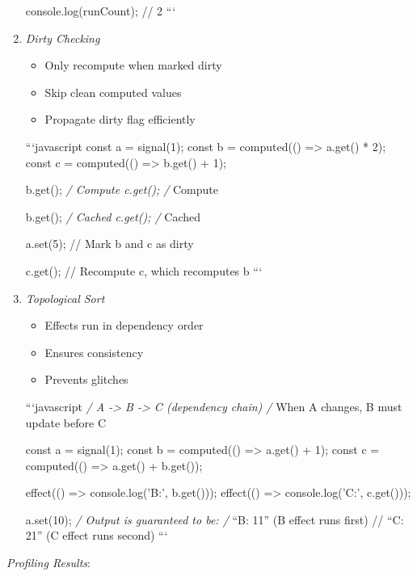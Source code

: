 \documentclass[11pt]{article}
\begin{document}
\begin{enumerate}
console.log(runCount); // 2
```

\item \emph{Dirty Checking}
\begin{itemize}
\item Only recompute when marked dirty
\item Skip clean computed values
\item Propagate dirty flag efficiently
\end{itemize}

```javascript
const a = signal(1);
const b = computed(() => a.get() * 2);
const c = computed(() => b.get() + 1);

b.get(); \emph{/ Compute
c.get(); /} Compute

b.get(); \emph{/ Cached
c.get(); /} Cached

a.set(5); // Mark b and c as dirty

c.get(); // Recompute c, which recomputes b
```

\item \emph{Topological Sort}
\begin{itemize}
\item Effects run in dependency order
\item Ensures consistency
\item Prevents glitches
\end{itemize}

```javascript
\emph{/ A -> B -> C (dependency chain)
/} When A changes, B must update before C

const a = signal(1);
const b = computed(() => a.get() + 1);
const c = computed(() => a.get() + b.get());

effect(() => console.log('B:', b.get()));
effect(() => console.log('C:', c.get()));

a.set(10);
\emph{/ Output is guaranteed to be:
/} ``B: 11'' (B effect runs first)
// ``C: 21'' (C effect runs second)
```
\end{enumerate}

\emph{Profiling Results}:
\end{document}
